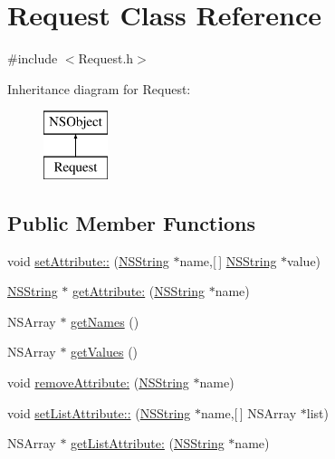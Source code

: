 \hypertarget{interface_request}{
\section{\-Request \-Class \-Reference}
\label{interface_request}
}


{\ttfamily \#include $<$\-Request.\-h$>$}

\-Inheritance diagram for \-Request\-:\begin{figure}[H]
\begin{center}
\leavevmode
\includegraphics[height=2.000000cm]{interface_request}
\end{center}
\end{figure}
\subsection*{\-Public \-Member \-Functions}
\begin{DoxyCompactItemize}
\item 
void \hyperlink{interface_request_a86171dee5b6c77f671c245699b4b3554}{set\-Attribute\-::} (\hyperlink{class_n_s_string}{\-N\-S\-String} $\ast$name,\mbox{[}$\,$\mbox{]} \hyperlink{class_n_s_string}{\-N\-S\-String} $\ast$value)
\item 
\hyperlink{class_n_s_string}{\-N\-S\-String} $\ast$ \hyperlink{interface_request_a41430ac98d91b88045636ad85c01f92b}{get\-Attribute\-:} (\hyperlink{class_n_s_string}{\-N\-S\-String} $\ast$name)
\item 
\-N\-S\-Array $\ast$ \hyperlink{interface_request_ad1ab6712c253685b242d2ceddf1612fe}{get\-Names} ()
\item 
\-N\-S\-Array $\ast$ \hyperlink{interface_request_a70294b772e4d6eea39e7e1d7cf057c31}{get\-Values} ()
\item 
void \hyperlink{interface_request_ab39394ca18de6dec3672c4f7d8846640}{remove\-Attribute\-:} (\hyperlink{class_n_s_string}{\-N\-S\-String} $\ast$name)
\item 
void \hyperlink{interface_request_ac5431f768f7914ddefc500029b5d5f22}{set\-List\-Attribute\-::} (\hyperlink{class_n_s_string}{\-N\-S\-String} $\ast$name,\mbox{[}$\,$\mbox{]} \-N\-S\-Array $\ast$list)
\item 
\-N\-S\-Array $\ast$ \hyperlink{interface_request_a7ccf016fc3da855794dd8d6851d68d6a}{get\-List\-Attribute\-:} (\hyperlink{class_n_s_string}{\-N\-S\-String} $\ast$name)
\end{DoxyCompactItemize}
